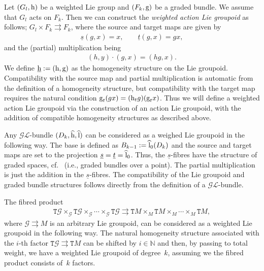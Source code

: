 \documentclass[pdftex]{sigma}
\newcommand{\rmh}{\textnormal{h}}
\newcommand{\rml}{\textnormal{l}}
\newcommand{\rmg}{\textnormal{g}}
\def\sT{{\mathtt T}}
\numberwithin{equation}{section}
\begin{document}
\begin{Example}\label{exa:8}
Let $(G_{l}, \rmh)$ be a weighted Lie group and $(F_{k}, \rmg)$ be a graded bundle. We assume that $G_{l}$ acts on $F_{k}$. Then we can construct the \emph{weighted action Lie groupoid} as follows; $G_{l}\times F_{k} \rightrightarrows F_{k}$, where the source and target maps are given by
\begin{gather*}
\underline{s}(g,x)= x, \qquad
 \underline{t}(g,x) = gx,
\end{gather*}
  and the (partial) multiplication being
\begin{gather*}
(h, y)\cdot (g, x) = (hg, x).
\end{gather*}
We def\/ine $\underline{\rmh} := (\rmh, \rmg)$ as the homogeneity structure on the Lie groupoid. Compatibility with the source map and partial multiplication is automatic from the def\/inition of a homogeneity structure, but compatibility with the target map requires the natural condition $ \rmg_{t}(g x) =(\rmh_{t}g)(\rmg_{t}x)$. Thus we will def\/ine a weighted action Lie groupoid via the construction of an action Lie groupoid, with the addition of compatible homogeneity structures as described above.
\end{Example}

\begin{Example}\label{exa:9}
Any $\mathcal{GL}$-bundle $(D_{k}, \widehat{\rmh}, \widehat{\rml})$ can be considered as a weighed Lie groupoid in the following way. The base is def\/ined as $B_{k-1} := \widehat{\rml}_{0}(D_{k})$ and the source and target maps are set to the projection $\underline{s} = \underline{t} = \widehat{\rml}_{0}$. Thus, the $\underline{s}$-f\/ibres have the structure of graded spaces, cf.~\cite{Grabowski2012} (i.e., graded bundles over a point). The partial multiplication is just the addition in the $\underline{s}$-f\/ibres.  The compatibility of the Lie groupoid and graded bundle structures follows directly from the def\/inition of a $\mathcal{GL}$-bundle.
\end{Example}



\begin{Example}\label{exa:10}
The f\/ibred product
\begin{gather*}
\sT \mathcal{G} \times_{\mathcal{G}} \sT \mathcal{G} \times_{\mathcal{G}} \cdots \times_{\mathcal{G}} \sT \mathcal{G} \rightrightarrows \sT M \times_{M} \sT M \times_{M} \cdots \times_{M}\sT M,
\end{gather*}
where $\mathcal{G}\rightrightarrows M$ is an arbitrary Lie groupoid, can be considered as a weighted Lie groupoid in the following way. The natural homogeneity structure associated with the $i$-th factor $\sT \mathcal{G} \rightrightarrows \sT M$ can be shifted by $i \in \mathbb{N}$ and then, by passing to total weight, we have a weighted Lie groupoid of degree~$k$, assuming we the f\/ibred product consists of~$k$ factors.
\end{Example}
\end{document}
